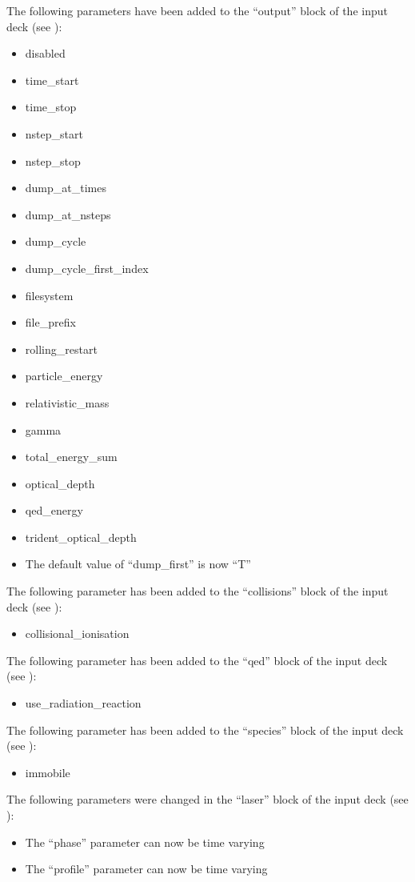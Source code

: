 \noindent The following parameters have been added to the ``output'' block of
the input deck (see ):
\begin{itemize}
\item disabled
\item time\_start
\item time\_stop
\item nstep\_start
\item nstep\_stop
\item dump\_at\_times
\item dump\_at\_nsteps
\item dump\_cycle
\item dump\_cycle\_first\_index
\item filesystem
\item file\_prefix
\item rolling\_restart
\item particle\_energy
\item relativistic\_mass
\item gamma
\item total\_energy\_sum
\item optical\_depth
\item qed\_energy
\item trident\_optical\_depth
\item The default value of ``dump\_first'' is now ``T''
\end{itemize}
\bigskip

\noindent The following parameter has been added to the ``collisions'' block of
the input deck (see ):
\begin{itemize}
\item collisional\_ionisation
\end{itemize}
\bigskip

\noindent The following parameter has been added to the ``qed'' block of
the input deck (see ):
\begin{itemize}
\item use\_radiation\_reaction
\end{itemize}
\bigskip

\noindent The following parameter has been added to the ``species'' block of
the input deck (see ):
\begin{itemize}
\item immobile
\end{itemize}
\bigskip

\noindent The following parameters were changed in the ``laser'' block of
the input deck (see ):
\begin{itemize}
\item The ``phase'' parameter can now be time varying
\item The ``profile'' parameter can now be time varying
\end{itemize}
\bigskip

